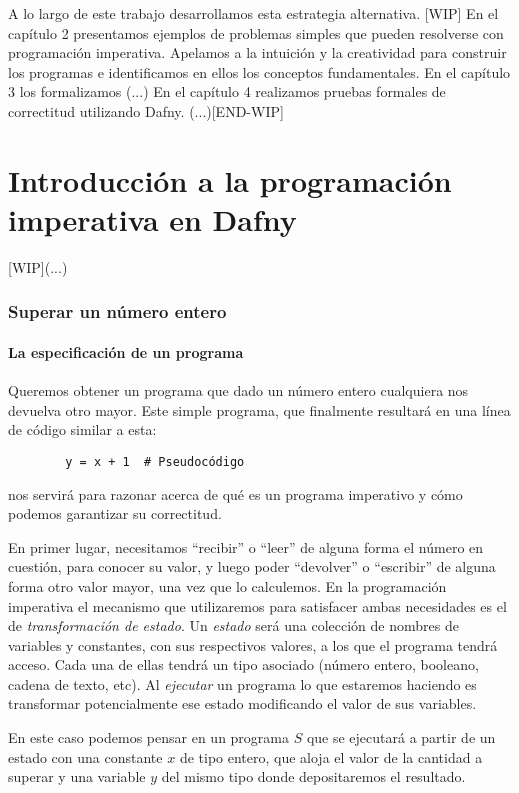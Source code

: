 \documentclass[12pt, a4paper, openany, fleqn]{book}
\begin{document}
    A lo largo de este trabajo desarrollamos esta estrategia alternativa.
    [WIP]
    En el capítulo 2 presentamos ejemplos de problemas simples que pueden resolverse con programación imperativa. Apelamos a la intuición y la creatividad para construir los programas e identificamos en ellos los conceptos fundamentales.
    En el capítulo 3 los formalizamos (...)
    En el capítulo 4 realizamos pruebas formales de correctitud utilizando Dafny. (...)[END-WIP]

    \chapter{Introducción a la programación imperativa en Dafny}
    [WIP](...)

    \subsection{Superar un número entero}
    \subsubsection*{La especificación de un programa}

    Queremos obtener un programa que dado un número entero cualquiera nos devuelva otro mayor. Este simple programa, que finalmente resultará en una línea de código similar a esta:
    \begin{verbatim}
        y = x + 1  # Pseudocódigo
    \end{verbatim}
    nos servirá para razonar acerca de qué es un programa imperativo y cómo podemos garantizar su correctitud.

    En primer lugar, necesitamos ``recibir'' o ``leer'' de alguna forma el número en cuestión, para conocer su valor, y luego poder ``devolver'' o ``escribir'' de alguna forma otro valor mayor, una vez que lo calculemos.
    En la programación imperativa el mecanismo que utilizaremos para satisfacer ambas necesidades es el de \textit{transformación de estado}.
    Un \textit{estado} será una colección de nombres de variables y constantes, con sus respectivos valores, a los que el programa tendrá acceso. Cada una de ellas tendrá un tipo asociado (número entero, booleano, cadena de texto, etc). Al \textit{ejecutar} un programa lo que estaremos haciendo es transformar potencialmente ese estado modificando el valor de sus variables.

    En este caso podemos pensar en un programa $S$ que se ejecutará a partir de un estado con una constante $x$ de tipo entero, que aloja el valor de la cantidad a superar y una variable $y$ del mismo tipo donde depositaremos el resultado.
\end{document}
